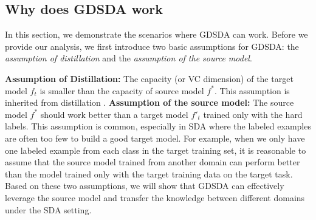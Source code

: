 \subsection{Why does GDSDA work}
In this section, we demonstrate the scenarios where GDSDA can work. Before we provide our analysis, we first introduce two basic assumptions for GDSDA: the \textit{assumption of distillation} and the \textit{assumption of the source model}.

\textbf{Assumption of Distillation:} The capacity (or VC dimension) of the target model $f_t$ is smaller than the capacity of source model $f^*$. This assumption is inherited from distillation \cite{lopez2015unifying}.
\textbf{Assumption of the source model:} The source model $f^*$ should work better than a target model $f'_t$ trained only with the hard labels. This assumption is common, especially in SDA where the labeled examples are often too few to build a good target model. For example, when we only have one labeled example from each class in the target training set, it is reasonable to assume that the source model trained from another domain can perform better than the model trained only with the target training data on the target task. Based on these two assumptions, we will show that GDSDA can effectively leverage the source model and transfer the knowledge between different domains under the SDA setting.

